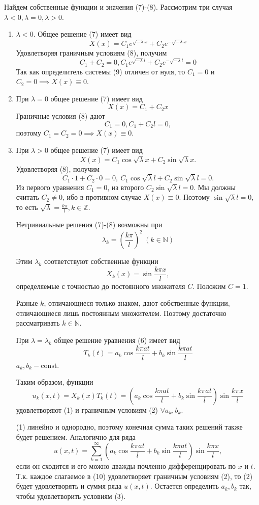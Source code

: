 Найдем собственные функции и значения (7)-(8). Рассмотрим три случая $\lambda<0, \lambda=0, \lambda>0$.
\begin{enumerate}
	\item{
			$\lambda<0$. Общее решение (7) имеет вид
			\[
				X(x) = C_1 e^{\sqrt{-\lambda}x} + C_2 e^{-\sqrt{-\lambda}x}
			\]
			Удовлетворяя граничным условиям (8), получим
			\[
				C_1 + C_2 = 0, C_1 e^{\sqrt{-\lambda} l}+C_2 e^{-\sqrt{-\lambda}l}=0 \tag{9}
			\]
			Так как определитель системы (9) отличен от нуля, то $C_1=0$ и $C_2=0 \implies X(x)\equiv 0$. 
	}
	\item{
			При $\lambda=0$ общее решение (7) имеет вид
			\[
				X(x) = C_1 + C_2 x
			\]
			Граничные условия (8) дают
			\[
				C_1 = 0, C_1 + C_2 l = 0,
			\]
			поэтому $C_1=C_2=0 \implies X(x)\equiv0.$
	}
	\item{
			При $\lambda > 0$ общее решение (7) имеет вид
			\[
				X(x) = C_1 \cos \sqrt{\lambda} x + C_2 \sin \sqrt{\lambda} x.
			\]
			Удовлетворяя (8), получим
			\[
				C_1 \cdot 1 + C_2 \cdot 0 = 0, ~ C_1 \cos \sqrt{\lambda} l + C_2 \sin \sqrt{\lambda} l = 0.
			\]
			Из первого уравнения $C_1 = 0$, из второго $C_2 \sin \sqrt{\lambda} l = 0$. Мы должны считать $C_2 \ne 0$, ибо в противном случае $X(x) \equiv 0$. Поэтому $\sin \sqrt{\lambda} l = 0$, то есть $\sqrt{\lambda} = \frac{k \pi}{l}, k \in \mathbb{Z}$.

			Нетривиальные решения (7)-(8) возможны при
			\[
				\lambda_k = \left( \frac{k \pi}{l} \right)^2 ~ (k \in \mathbb{N})
			\]

			Этим $\lambda_k$ соответствуют собственные функции
			\[
				X_k (x) = \sin \frac{k \pi x}{l},
			\]
			определяемые с точностью до постоянного множителя $C$. Положим $C=1$.

			Разные $k$, отличающиеся только знаком, дают собственные функции, отличающиеся лишь постоянным множителем. Поэтому достаточно рассматривать $k \in \mathbb{N}$.

			При $\lambda = \lambda_k$ общее решение уравнения (6) имеет вид
			\[
				T_k (t) = a_k \cos \frac{k \pi at}{l} + b_k \sin \frac{k \pi at}{l}
			\]
			$a_k, b_k - \mathrm{const}$.

			Таким образом, функции
			\[
				u_k (x, t) = X_k (x) T_k (t) = \left( a_k \cos \frac{k \pi at}{l} + b_k \sin \frac{k \pi at}{l} \right) \sin \frac{k \pi x}{l}
			\]
			удовлетворяют (1) и граничным условиям (2) $\forall a_k, b_k$.

			(1) линейно и однородно, поэтому конечная сумма таких решений также будет решением. Аналогично для ряда
			\[
				u(x, t) = \sum_{k=1}^\infty \left( a_k \cos \frac{k \pi at}{l} + b_k \sin \frac{k \pi at}{l} \right) \sin \frac{k \pi x}{l}, \tag{10}
			\]
			если он сходится и его можно дважды почленно дифференцировать по $x$ и $t$. Т.к. каждое слагаемое в (10) удовлетворяет граничным условиям (2), то (2) будет удовлетворять и суммя ряда $u(x, t)$. Остается определить $a_k, b_k$ так, чтобы удовлетворить условиям (3).

}
\end{enumerate}
